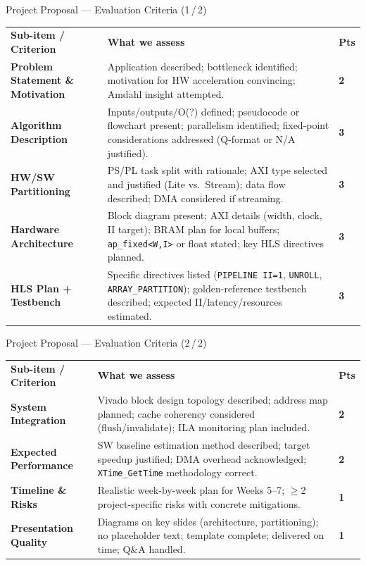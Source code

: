 \documentclass[10pt,aspectratio=169]{beamer}
\begin{document}
\begin{frame}{Project Proposal --- Evaluation Criteria (1\,/\,2)}
\setlength{\extrarowheight}{2pt}\setlength{\tabcolsep}{4pt}
\begin{tabular}{m{3.8cm}m{8.8cm}>{\raggedleft\arraybackslash}m{1.4cm}}
\rowcolor{CP}
\textbf{\color{white}Sub-item / Criterion} &
\textbf{\color{white}What we assess} &
\textbf{\color{white}Pts} \tabularnewline
\textbf{Problem Statement \& Motivation} &
  {\color{TxtMd}Application described; bottleneck identified; motivation for HW acceleration convincing; Amdahl insight attempted.} &
  \textbf{\color{CP}2} \tabularnewline
\textbf{Algorithm Description} &
  {\color{TxtMd}Inputs/outputs/O(?) defined; pseudocode or flowchart present; parallelism identified; fixed-point considerations addressed (Q-format or N/A justified).} &
  \textbf{\color{CP}3} \tabularnewline
\textbf{HW/SW Partitioning} &
  {\color{TxtMd}PS/PL task split with rationale; AXI type selected and justified (Lite vs.\ Stream); data flow described; DMA considered if streaming.} &
  \textbf{\color{CP}3} \tabularnewline
\textbf{Hardware Architecture} &
  {\color{TxtMd}Block diagram present; AXI details (width, clock, II target); BRAM plan for local buffers; \texttt{ap\_fixed<W,I>} or float stated; key HLS directives planned.} &
  \textbf{\color{CP}3} \tabularnewline
\textbf{HLS Plan + Testbench} &
  {\color{TxtMd}Specific directives listed (\texttt{PIPELINE II=1}, \texttt{UNROLL}, \texttt{ARRAY\_PARTITION}); golden-reference testbench described; expected II/latency/resources estimated.} &
  \textbf{\color{CP}3} \tabularnewline
\end{tabular}
\end{frame}

\begin{frame}{Project Proposal --- Evaluation Criteria (2\,/\,2)}
\setlength{\extrarowheight}{2pt}\setlength{\tabcolsep}{4pt}
\begin{tabular}{m{3.8cm}m{8.8cm}>{\raggedleft\arraybackslash}m{1.4cm}}
\rowcolor{CP}
\textbf{\color{white}Sub-item / Criterion} &
\textbf{\color{white}What we assess} &
\textbf{\color{white}Pts} \tabularnewline
\textbf{System Integration} &
  {\color{TxtMd}Vivado block design topology described; address map planned; cache coherency considered (flush/invalidate); ILA monitoring plan included.} &
  \textbf{\color{CP}2} \tabularnewline
\textbf{Expected Performance} &
  {\color{TxtMd}SW baseline estimation method described; target speedup justified; DMA overhead acknowledged; \texttt{XTime\_GetTime} methodology correct.} &
  \textbf{\color{CP}2} \tabularnewline
\textbf{Timeline \& Risks} &
  {\color{TxtMd}Realistic week-by-week plan for Weeks 5--7; $\geq$2 project-specific risks with concrete mitigations.} &
  \textbf{\color{CP}1} \tabularnewline
\textbf{Presentation Quality} &
  {\color{TxtMd}Diagrams on key slides (architecture, partitioning); no placeholder text; template complete; delivered on time; Q\&A handled.} &
  \textbf{\color{CP}1} \tabularnewline
\end{tabular}
\end{frame}
\end{document}
